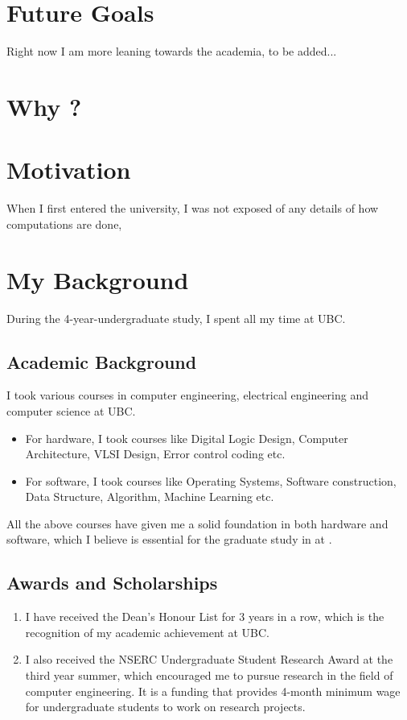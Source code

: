 \documentclass[a4 paper, 10pt]{article}
\begin{document}
{\section*{Future Goals}
Right now I am more leaning towards the academia, to be added...
\section*{Why \theSchoolFullName{}?}


\section*{Motivation}
When I first entered the university, I was not exposed of any details of how computations are done,
\section*{My Background}
During the 4-year-undergraduate study, I spent all my time at UBC.
\subsection*{Academic Background}
I took various courses in computer engineering, electrical engineering and computer science at UBC. 

\begin{itemize}
    \item For hardware, I took courses like Digital Logic Design, Computer Architecture, VLSI Design, Error control coding etc. 
    \item For software, I took courses like Operating Systems, Software construction, Data Structure, Algorithm, Machine Learning etc.
\end{itemize}

All the above courses have given me a solid foundation in both hardware and software, which I believe is essential for the graduate study in \theDepartment{} at \theSchoolFullName{}.
\subsection*{Awards and Scholarships}
\begin{enumerate}
    \item I have received the Dean's Honour List for 3 years in a row, which is the recognition of my academic achievement at UBC.
    \item I also received the NSERC Undergraduate Student Research Award at the third year summer, which encouraged me to pursue research in the field of computer engineering. It is a funding that provides 4-month minimum wage for undergraduate students to work on research projects.
\end{enumerate}

}
\end{document}
